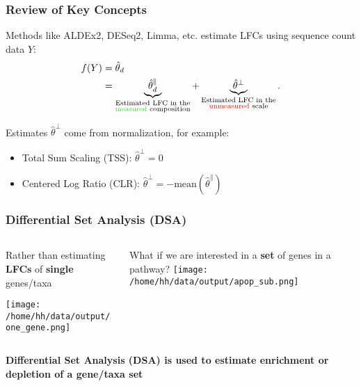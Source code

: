 \documentclass[11pt,t]{beamer}
\begin{document}
\begin{frame}
  \frametitle{Review of Key Concepts}

    Methods like ALDEx2, DESeq2, Limma, etc. estimate LFCs using sequence count data \(Y\):
    \begin{align*}
    f(Y) &= \hat{\theta}_d \\
    &= \underbrace{\hat{\theta}^\parallel_d}_{\substack{\text{Estimated LFC in the} \\ \text{\textcolor{green}{measured} composition}}} + \underbrace{\hat{\theta}^\perp}_{\substack{\text{Estimated LFC in the} \\ \text{\textcolor{red}{unmeasured} scale}}}.
    \end{align*}

    \pause

    Estimates \(\hat{\theta}^\perp\) come from normalization, for example:
    \begin{itemize}
      \item Total Sum Scaling (TSS): \(\hat{\theta}^\perp=0\)
      \pause
      \item Centered Log Ratio (CLR): \(\hat{\theta}^\perp=-\text{mean}(\hat{\theta}^\parallel)\)
    \end{itemize}
\end{frame}

\begin{frame}
  \frametitle{Differential Set Analysis (DSA)}

  \begin{columns}
    \begin{column}{0.45\textwidth}
      \begin{center}
        Rather than estimating \textbf{LFCs} of \textbf{single} genes/taxa

        \vspace{50px}
        \texttt{[image: /home/hh/data/output/one\_gene.png]}
      \end{center}
    \end{column}
    \vrule{}
    \begin{column}{0.55\textwidth}  
      \begin{center}
        What if we are interested in a \textbf{set} of genes in a pathway?
       \texttt{[image: /home/hh/data/output/apop\_sub.png]}
     \end{center}
  \end{column}
  \end{columns}

  \begin{center}
    \textbf{Differential Set Analysis (DSA) is used to estimate enrichment or depletion of a gene/taxa set}
  \end{center}
\end{frame}
  
\end{document}
